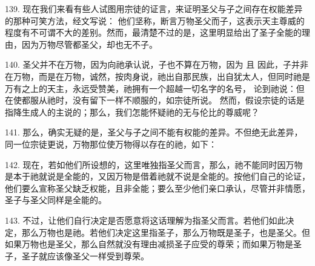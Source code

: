 \par

139. 现在我们来看有些人试图用宗徒的证言，来证明圣父与子之间存在权能差异的那种可笑方法，经文写说：  他们坚称，断言万物圣父而子，这表示天主尊威的程度有不可谓不大的差别。然而，最清楚不过的是，这里明显给出了圣子全能的理由，因为万物尽管都圣父，却也无不子。\par

140. 圣父并不在万物，因为向祂承认说，子也不算在万物，因为  且  因此，子并非在万物，而是在万物，诚然，按肉身说，祂出自那民族，出自犹太人，但同时祂是万有之上的天主，永远受赞美，祂拥有一个超越一切名字的名号， 论到祂说：但在使都服从祂时，没有留下一样不顺服的，如宗徒所说。 然而，假设宗徒的话是指降生成人的主说的；那么，我们怎能怀疑祂的无与伦比的尊威呢？\par

141. 那么，确实无疑的是，圣父与子之间不能有权能的差异。不但绝无此差异，同一位宗徒更说，万物那位使万物得以存在的祂，如下： \par

142. 现在，若如他们所设想的，这里唯独指圣父而言，那么，祂不能同时因万物是本于祂就说是全能的，又因万物是借着祂就不说是全能的。按他们自己的论证，他们要么宣称圣父缺乏权能，且非全能；要么至少他们亲口承认，尽管并非情愿，圣子与圣父同样是全能的。\par

143. 不过，让他们自行决定是否愿意将这话理解为指圣父而言。若他们如此决定，那么万物也是祂。若他们决定这里指圣子，那么万物既是圣子，也是圣父。但如果万物也是圣父，那么自然就没有理由减损圣子应受的尊荣；而如果万物是圣子，圣子就应该像圣父一样受到尊荣。\par

